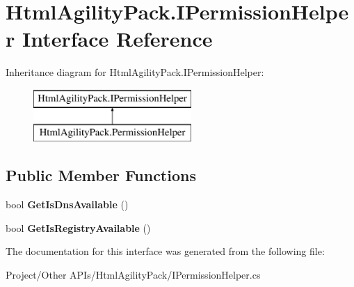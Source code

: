 \hypertarget{interface_html_agility_pack_1_1_i_permission_helper}{}\section{Html\+Agility\+Pack.\+I\+Permission\+Helper Interface Reference}
\label{interface_html_agility_pack_1_1_i_permission_helper}
Inheritance diagram for Html\+Agility\+Pack.\+I\+Permission\+Helper\+:\begin{figure}[H]
\begin{center}
\leavevmode
\includegraphics[height=2.000000cm]{interface_html_agility_pack_1_1_i_permission_helper}
\end{center}
\end{figure}
\subsection*{Public Member Functions}
\begin{DoxyCompactItemize}
\item 
\mbox{\label{interface_html_agility_pack_1_1_i_permission_helper_ae4bd1e14d6dc7c398fbef8bfc76bc83e}} 
bool {\bfseries Get\+Is\+Dns\+Available} ()
\item 
\mbox{\label{interface_html_agility_pack_1_1_i_permission_helper_a1ac2ee4504f537df82920c718d525035}} 
bool {\bfseries Get\+Is\+Registry\+Available} ()
\end{DoxyCompactItemize}


The documentation for this interface was generated from the following file\+:\begin{DoxyCompactItemize}
\item 
Project/\+Other A\+P\+Is/\+Html\+Agility\+Pack/I\+Permission\+Helper.\+cs\end{DoxyCompactItemize}
